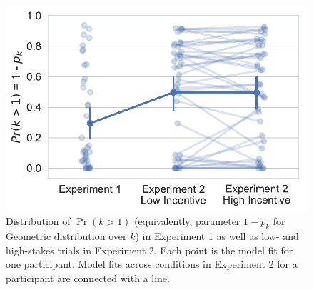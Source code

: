 \documentclass[10pt,letterpaper]{article}
\newcommand{\todo}[1]{\textcolor{red}{\textsc{[TODO: #1]}}}
\begin{document}
\begin{figure}[ht]
    \centering
    \includegraphics[scale=0.55]{geom-k-p}
    \caption{Distribution of $\Pr(k > 1)$ (equivalently, parameter $1-p_k$ for Geometric distribution over $k$) in Experiment 1 as well as low- and high-stakes trials in Experiment 2. Each point is the model fit for one participant. Model fits across conditions in Experiment 2 for a participant are connected with a line.}
    \label{fig:p_k}
\end{figure}



\end{document}
